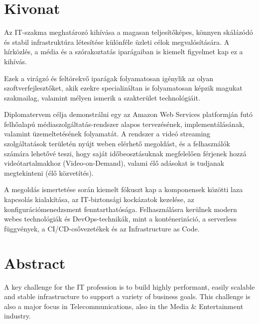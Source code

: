 \setcounter{page}{1}

\selecthungarian

\chapter*{Kivonat}

Az IT-szakma meghatározó kihívása a magasan teljesítőképes, könnyen skálázódó és stabil infrastruktúra létesítése különféle üzleti célok megvalósítására. A hírközlés, a média és a szórakoztatás iparágaiban is kiemelt figyelmet kap ez a kihívás.

Ezek a virágzó és feltörekvő iparágak folyamatosan igénylik az olyan szoftverfejlesztőket, akik ezekre specializáltan is folyamatosan képzik magukat szakmailag, valamint mélyen ismerik a szakterület technológiáit.

Diplomatervem célja demonstrálni egy az Amazon Web Services platformján futó felhőalapú médiaszolgáltatás-rendszer alapos tervezésének, implementálásának, valamint üzemeltetésének folyamatát. A rendszer a videó streaming szolgáltatások területén nyújt weben elérhető megoldást, és a felhasználók számára lehetővé teszi, hogy saját időbeosztásuknak megfelelően férjenek hozzá videótartalmakhoz (Video-on-Demand), valami élő adásokat is tudjanak megtekinteni (élő közvetítés).

A megoldás ismertetése során kiemelt fókuszt kap a komponensek közötti laza kapcsolás kialakítása, az IT-biztonsági kockázatok kezelése, az konfigurációmenedzsment fenntarthatósága. Felhasználásra kerülnek modern webes technológiák és DevOps-technikák, mint a konténerizáció, a serverless függvények, a CI/CD-csővezetékek és az Infrastructure as Code.

\vfill
\selectenglish

\chapter*{Abstract}

A key challenge for the IT profession is to build highly performant, easily scalable and stable infrastructure to support a variety of business goals. This challenge is also a major focus in Telecommunications, also in the Media \& Entertainment industry.

